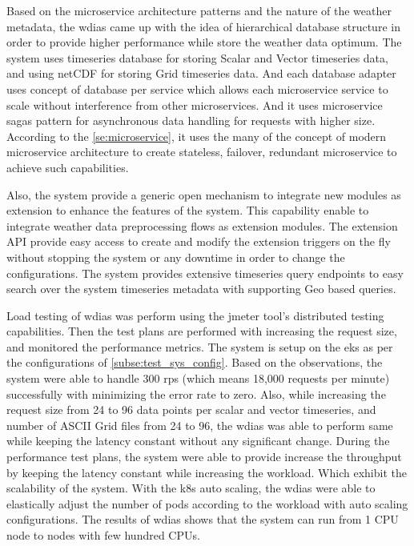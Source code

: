 Based on the microservice architecture patterns and the nature of the weather metadata, the \acrshort{wdias} came up with the idea of hierarchical database structure in order to provide higher performance while store the weather data optimum. The system uses timeseries database for storing Scalar and Vector timeseries data, and using \acrshort{netCDF} for storing Grid timeseries data. And each database adapter uses concept of database per service which allows each microservice service to scale without interference from other microservices.
And it uses microservice sagas pattern for asynchronous data handling for requests with higher size. According to the \cref{se:microservice}, it uses the many of the concept of modern microservice architecture to create stateless, failover, redundant microservice to achieve such capabilities.

Also, the system provide a generic open mechanism to integrate new modules as extension to enhance the features of the system. This capability enable to integrate weather data preprocessing flows as extension modules.
The extension API provide easy access to create and modify the extension triggers on the fly without stopping the system or any downtime in order to change the configurations.
The system provides extensive timeseries query endpoints to easy search over the system timeseries metadata with supporting Geo based queries.

Load testing of \acrshort{wdias} was perform using the \acrshort{jmeter} tool's distributed testing capabilities. Then the test plans are performed with increasing the request size, and monitored the performance metrics. The system is setup on the \acrfull{eks} as per the configurations of \cref{subse:test_sys_config}. Based on the observations, the system were able to handle 300 \acrshort{rps} (which means 18,000 requests per minute) successfully with minimizing the error rate to zero. Also, while increasing the request size from 24 to 96 data points per scalar and vector timeseries, and number of ASCII Grid files from 24 to 96, the \acrshort{wdias} was able to perform same while keeping the latency constant without any significant change. During the performance test plans, the system were able to provide increase the throughput by keeping the latency constant while increasing the workload. Which exhibit the scalability of the system.
With the \acrshort{k8s} auto scaling, the \acrshort{wdias} were able to elastically adjust the number of pods according to the workload with auto scaling configurations. 
The results of \acrshort{wdias} shows that the system can run from 1 CPU node to nodes with few hundred CPUs.